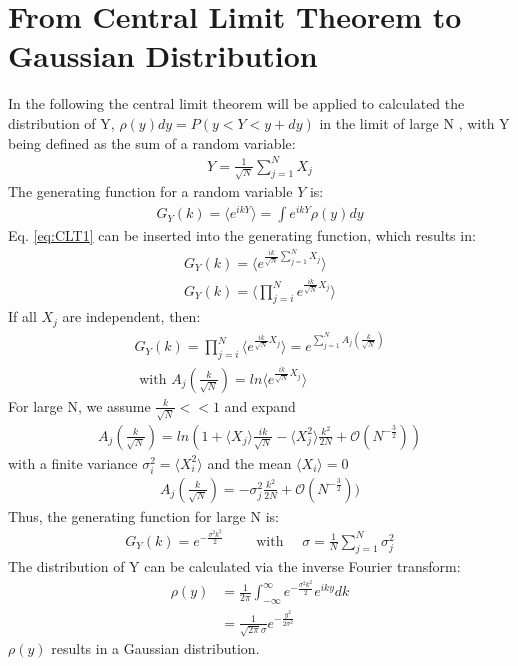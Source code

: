 \documentclass[
  a4paper,BCOR10mm,twoside,
  headsepline,footsepline,%
  fleqn,openbib
]{scrbook}
\begin{document}
\section{From Central Limit Theorem to Gaussian Distribution}\label{append:CLT}
In the following the central limit theorem will be applied to calculated the distribution of Y,  $\rho(y)dy=P(y<Y<y+dy)$ in the limit of large N , with Y being defined as the sum of a random variable:
 \begin{align}
  Y = \frac{1}{\sqrt{N}} \sum_{j=1}^N X_j \label{eq:CLT1}
 \end{align}
The generating function for a random variable $Y$ is: 
\begin{align}
 G_Y(k)=\langle e^{ikY}\rangle = \int e^{ikY} \rho(y)dy
\end{align}
Eq. \ref{eq:CLT1} can be inserted into the generating function, which results in:
\begin{align*}
G_Y(k)=\langle e^{\frac{ik}{\sqrt{N}} \sum_{j=1}^N X_j}\rangle \\
G_Y(k)=\langle \prod_{j=i}^N e^{\frac{ik}{\sqrt{N}} X_j} \rangle 
\end{align*}
If all $X_j$ are independent, then:
\begin{align}
 G_Y(k)= \prod_{j=i}^N \langle e^{\frac{ik}{\sqrt{N}} X_j} \rangle =e^{\sum_{j=1}^N A_j (\frac{k}{\sqrt{N}})} \\ \nonumber \text{ with } A_j(\frac{k}{\sqrt{N}})= ln \langle e^{\frac{ik}{\sqrt{N}} X_j} \rangle 
\end{align}
For large N, we assume $\frac{k}{\sqrt{N}} << 1$ and expand
\begin{align}
 A_j(\frac{k}{\sqrt{N}}) = ln(1+ \langle X_j \rangle \frac{ik}{\sqrt{N}} - \langle X_{j}^2 \rangle \frac{k^2}{2N}+\mathcal{O}(N^{- \frac{3}{2}}))
\end{align}
 with a finite variance $ \sigma_i^2=\langle X_{i}^2\rangle $ and the mean $\langle X_{i}\rangle = 0$
\begin{align}
 A_j(\frac{k}{\sqrt{N}}) = -\sigma_j^2 \frac{k^2}{2N}+\mathcal{O}(N^{- \frac{3}{2}}))
\end{align}
Thus, the generating function for large N is:
\begin{align}
 G_Y(k)=e^{- \frac{\sigma^2 k^2}{2}} \qquad \text{ with } \quad \sigma =\frac{1}{N} \sum_{j=1}^N \sigma_j^2 
\end{align}
The distribution of Y can be calculated via the inverse Fourier transform:
\begin{align}
 \rho(y) &=\frac{1}{2 \pi} \int_{-\infty}^{\infty} e^{- \frac{\sigma^2 k^2}{2}} e^{i k y} dk \\  
 &=\frac{1}{\sqrt{2 \pi} \sigma } e^{-\frac{y^2}{2 \sigma^2}}
\end{align}
$\rho(y)$ results in a Gaussian distribution.
\end{document}
